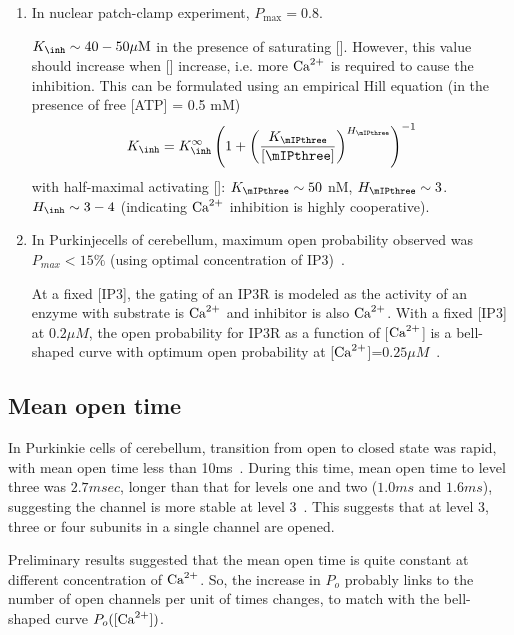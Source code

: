 \begin{enumerate}
  \item In nuclear patch-clamp experiment, $P_\max = 0.8$. 
  
  $K_\inh \sim 40-50\muM$ in the presence of saturating [\IPthree]. However,
  this value should increase when [\IPthree] increase, i.e. more ${\text{Ca}^{2+}}$ is
  required to cause the inhibition. This can be formulated using an empirical
  Hill equation (in the presence of free [ATP] = 0.5 mM)
  \begin{equation}
  K_\inh = K^\infty_\inh \left( 1 + \left( \frac{K_\mIPthree}{[\mIPthree]}
  \right)^{H_\mIPthree} \right)^{-1}
  \end{equation}
  with half-maximal activating [\IPthree]: $K_\mIPthree \sim 50$ nM,
  $H_\mIPthree \sim 3$. $H_\inh \sim 3-4$ (indicating ${\text{Ca}^{2+}}$ inhibition is highly
  cooperative). 

  \item  
In Purkinjecells of cerebellum, maximum open probability observed
was $P_{max} < 15\%$ (using optimal concentration of
IP3)~\cite{watras1991ip3r}. 

At a fixed [IP3], the gating of an IP3R is modeled as the activity of an enzyme
with substrate is ${\text{Ca}^{2+}}$ and inhibitor is also
 ${\text{Ca}^{2+}}$.  With a fixed [IP3] at $0.2\mu M$, the
open probability for IP3R as a function of [${\text{Ca}^{2+}}$] is a bell-shaped curve with
optimum open probability at [${\text{Ca}^{2+}}$]=$0.25\mu M$~\cite{bezprozvanny1991ip3r}.

\end{enumerate} 

\subsection{Mean open time}
\label{sec:mean-open-time-IP3R}
\label{sec:IP3R-mean-open-time}


In Purkinkie cells of cerebellum, transition from open to closed state was
rapid, with mean open time less than 10ms~\cite{watras1991ip3r}. During this
time, mean open time to level three was $2.7msec$, longer than that for levels
one and two ($1.0ms$ and $1.6ms$), suggesting the channel is more stable at
level 3~\cite{watras1991ip3r}. This suggests that at level 3, three or four
subunits in a single channel are opened. 

Preliminary results suggested that the mean open time is quite constant at
different concentration of  ${\text{Ca}^{2+}}$. So, the increase in $P_o$ probably links to
the number of open channels per unit of times changes, to match with the
bell-shaped curve $P_o([\ce{Ca^2+}])$.





